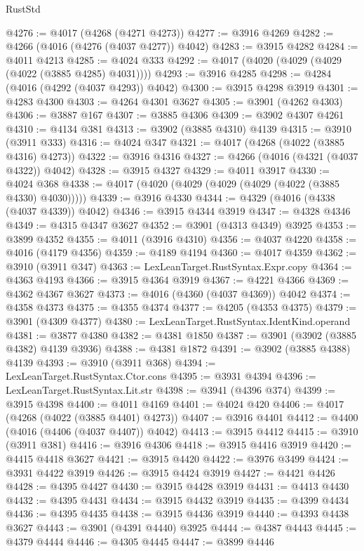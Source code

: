 \begin{lexlean}{RustStd}
\begin{coremodule}
@4276 := @4017 (@4268 (@4271 @4273))
@4277 := @3916 @4269
@4282 := @4266 (@4016 (@4276 (@4037 @4277)) @4042)
@4283 := @3915 @4282
@4284 := @4011 @4213
@4285 := @4024 @333
@4292 := @4017 (@4020 (@4029 (@4029 (@4022 (@3885 @4285) @4031))))
@4293 := @3916 @4285
@4298 := @4284 (@4016 (@4292 (@4037 @4293)) @4042)
@4300 := @3915 @4298 @3919
@4301 := @4283 @4300
@4303 := @4264 @4301 @3627
@4305 := @3901 (@4262 @4303)
@4306 := @3887 @167
@4307 := @3885 @4306
@4309 := @3902 @4307 @4261
@4310 := @4134 @381
@4313 := @3902 (@3885 @4310) @4139
@4315 := @3910 (@3911 @333)
@4316 := @4024 @347
@4321 := @4017 (@4268 (@4022 (@3885 @4316) @4273))
@4322 := @3916 @4316
@4327 := @4266 (@4016 (@4321 (@4037 @4322)) @4042)
@4328 := @3915 @4327
@4329 := @4011 @3917
@4330 := @4024 @368
@4338 := @4017 (@4020 (@4029 (@4029 (@4029 (@4022 (@3885 @4330) @4030)))))
@4339 := @3916 @4330
@4344 := @4329 (@4016 (@4338 (@4037 @4339)) @4042)
@4346 := @3915 @4344 @3919
@4347 := @4328 @4346
@4349 := @4315 @4347 @3627
@4352 := @3901 (@4313 @4349) @3925
@4353 := @3899 @4352
@4355 := @4011 (@3916 @4310)
@4356 := @4037 @4220
@4358 := @4016 (@4179 @4356)
@4359 := @4189 @4194
@4360 := @4017 @4359
@4362 := @3910 (@3911 @347)
@4363 := LexLeanTarget.RustSyntax.Expr.copy
@4364 := @4363 @4193
@4366 := @3915 @4364 @3919
@4367 := @4221 @4366
@4369 := @4362 @4367 @3627
@4373 := @4016 (@4360 (@4037 @4369)) @4042
@4374 := @4358 @4373
@4375 := @4355 @4374
@4377 := @4205 (@4353 @4375)
@4379 := @3901 (@4309 @4377)
@4380 := LexLeanTarget.RustSyntax.IdentKind.operand
@4381 := @3877 @4380
@4382 := @4381 @1850
@4387 := @3901 (@3902 (@3885 @4382) @4139 @3936)
@4388 := @4381 @1872
@4391 := @3902 (@3885 @4388) @4139
@4393 := @3910 (@3911 @368)
@4394 := LexLeanTarget.RustSyntax.Ctor.cons
@4395 := @3931 @4394
@4396 := LexLeanTarget.RustSyntax.Lit.str
@4398 := @3941 (@4396 @374)
@4399 := @3915 @4398
@4400 := @4011 @4169
@4401 := @4024 @420
@4406 := @4017 (@4268 (@4022 (@3885 @4401) @4273))
@4407 := @3916 @4401
@4412 := @4400 (@4016 (@4406 (@4037 @4407)) @4042)
@4413 := @3915 @4412
@4415 := @3910 (@3911 @381)
@4416 := @3916 @4306
@4418 := @3915 @4416 @3919
@4420 := @4415 @4418 @3627
@4421 := @3915 @4420
@4422 := @3976 @3499
@4424 := @3931 @4422 @3919
@4426 := @3915 @4424 @3919
@4427 := @4421 @4426
@4428 := @4395 @4427
@4430 := @3915 @4428 @3919
@4431 := @4413 @4430
@4432 := @4395 @4431
@4434 := @3915 @4432 @3919
@4435 := @4399 @4434
@4436 := @4395 @4435
@4438 := @3915 @4436 @3919
@4440 := @4393 @4438 @3627
@4443 := @3901 (@4391 @4440) @3925
@4444 := @4387 @4443
@4445 := @4379 @4444
@4446 := @4305 @4445
@4447 := @3899 @4446

\end{coremodule}
\end{lexlean}
